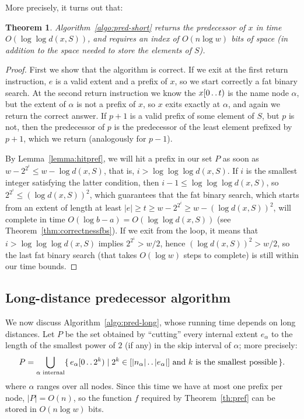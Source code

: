 \documentclass[a4paper,11pt]{article}
\newtheorem{theorem}{Theorem}[section]
\newcommand{\?}{\mskip1.5mu}
\def\..{\,\mathpunct{\ldotp\ldotp}} %
\begin{document}
More precisely, it turns out that:
\begin{theorem}
Algorithm~\ref{algo:pred-short} returns the predecessor of $x$
in time $O(\log\log d(x,S))$, and requires an index of $O(n \log w )$
bits of space (in addition to the space needed to store the elements of $S$).
\end{theorem}
\begin{proof}
First we show that the algorithm is correct. If we exit at the first return
instruction, $e$ is a valid extent and a prefix of $x$, so we start correctly a
fat binary search. At the second return instruction we know the $x[0\..t)$ is
the name node $\alpha$, but the extent of $\alpha$ is not a prefix of $x$, so
$x$ exits exactly at $\alpha$, and again we return the correct answer. If $p+1$ is a valid prefix of some element of $S$, but $p$ is not, then the predecessor
of $p$ is the predecessor of the least element prefixed by $p+1$, which we
return (analogously for $p-1$).

By Lemma~\ref{lemma:hitpref}, we will hit a prefix in our set $P$ as soon as
$w-2^{2^i}\leq w-\log d(x,S)$, that is, $i>\log\log\log d(x,S)$. If $i$ is the
smallest integer satisfying the latter condition, then $i-1\leq \log\log\log
d(x,S)$, so $2^{2^i}\leq (\log d(x,S))^2$, which guarantees that the fat binary
search, which starts from an extent of length at least $|e| \geq t \geq
w-2^{2^i} \geq w-(\log d(x,S))^2$, will complete in time $O(\log
b-a)=O(\log\log d(x,S))$ (see Theorem~\ref{thm:correctnessfbs}). If we exit from the loop,
it means that $i>\log\log\log d(x,S)$ implies $2^{2^i}>w/2$, hence
$(\log d(x,S))^2>w/2$, so the last fat binary search (that takes $O(\log w)$
steps to complete) is still within our time bounds.
\end{proof}

\subsection{Long-distance predecessor algorithm}
\label{sec:long}

We now discuss Algorithm~\ref{algo:pred-long}, whose running time depends on long
distances. Let $P$ be the set obtained by ``cutting''
every internal extent $e_\alpha$ to the length of the smallest power of $2$ (if
any) in the skip interval of $\alpha$; more precisely:
\[
	P=\bigcup_\text{$\alpha$ internal}\{\,e_\alpha[0\..2^k) \mid 2^k \in
	[|n_\alpha|\..|e_\alpha|] \text{ and $k$ is the smallest possible}\,\}.
\]
where $\alpha$ ranges over all nodes. Since this time we
have at most one prefix per node, $|P|=O(n)$, so the function $f$ required by
Theorem~\ref{th:pref} can be stored in $O(n\log w)$ bits. 
\end{document}
